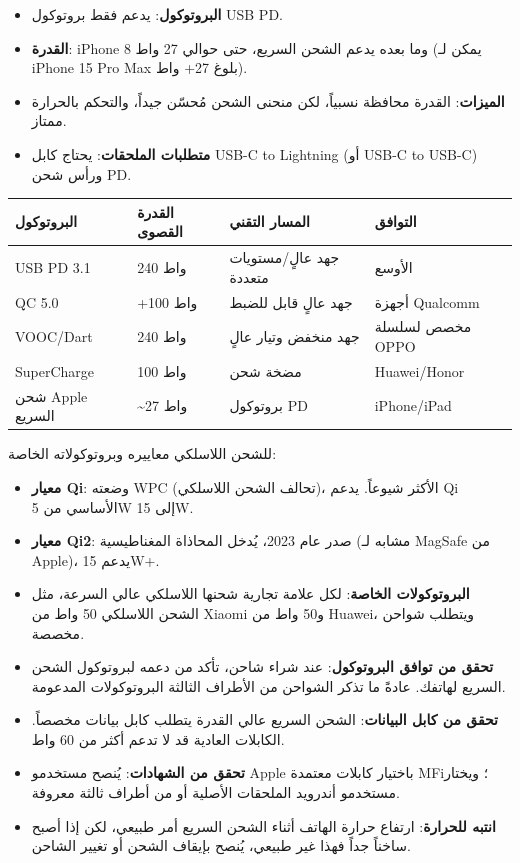 \begin{itemize}
  \item \textbf{البروتوكول}: يدعم فقط بروتوكول USB PD.
  \item \textbf{القدرة}: iPhone 8 وما بعده يدعم الشحن السريع، حتى حوالي 27 واط (يمكن لـ iPhone 15 Pro Max بلوغ 27+ واط).
  \item \textbf{الميزات}: القدرة محافظة نسبياً، لكن منحنى الشحن مُحسّن جيداً، والتحكم بالحرارة ممتاز.
  \item \textbf{متطلبات الملحقات}: يحتاج كابل USB-C to Lightning (أو USB-C to USB-C) ورأس شحن PD.
\end{itemize}


\begin{center}
\begin{tabularx}{\linewidth}{|X|X|X|X|}
\hline
\textbf{البروتوكول} & \textbf{القدرة القصوى} & \textbf{المسار التقني} & \textbf{التوافق} \tabularnewline
\hline
USB PD 3.1 & 240 واط & جهد عالٍ/مستويات متعددة & الأوسع \tabularnewline
QC 5.0 & +100 واط & جهد عالٍ قابل للضبط & أجهزة Qualcomm \tabularnewline
VOOC/Dart & 240 واط & جهد منخفض وتيار عالٍ & مخصص لسلسلة OPPO \tabularnewline
SuperCharge & 100 واط & مضخة شحن & Huawei/Honor \tabularnewline
شحن Apple السريع & \textasciitilde{}27 واط & بروتوكول PD & iPhone/iPad \tabularnewline
\hline
\end{tabularx}
\end{center}


للشحن اللاسلكي معاييره وبروتوكولاته الخاصة:

\begin{itemize}
  \item \textbf{معيار Qi}: وضعته WPC (تحالف الشحن اللاسلكي)، الأكثر شيوعاً. يدعم Qi الأساسي من 5W إلى 15W.
  \item \textbf{معيار Qi2}: صدر عام 2023، يُدخل المحاذاة المغناطيسية (مشابه لـ MagSafe من Apple)، يدعم 15W+.
  \item \textbf{البروتوكولات الخاصة}: لكل علامة تجارية شحنها اللاسلكي عالي السرعة، مثل الشحن اللاسلكي 50 واط من Xiaomi و50 واط من Huawei، ويتطلب شواحن مخصصة.
\end{itemize}


\begin{itemize}
  \item \textbf{تحقق من توافق البروتوكول}: عند شراء شاحن، تأكد من دعمه لبروتوكول الشحن السريع لهاتفك. عادةً ما تذكر الشواحن من الأطراف الثالثة البروتوكولات المدعومة.
  \item \textbf{تحقق من كابل البيانات}: الشحن السريع عالي القدرة يتطلب كابل بيانات مخصصاً. الكابلات العادية قد لا تدعم أكثر من 60 واط.
  \item \textbf{تحقق من الشهادات}: يُنصح مستخدمو Apple باختيار كابلات معتمدة MFi؛ ويختار مستخدمو أندرويد الملحقات الأصلية أو من أطراف ثالثة معروفة.
  \item \textbf{انتبه للحرارة}: ارتفاع حرارة الهاتف أثناء الشحن السريع أمر طبيعي، لكن إذا أصبح ساخناً جداً فهذا غير طبيعي، يُنصح بإيقاف الشحن أو تغيير الشاحن.
\end{itemize}

